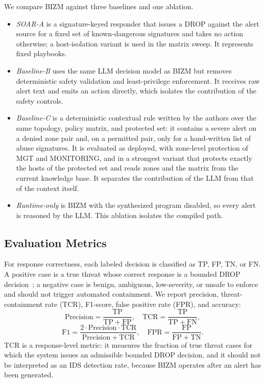 \documentclass[final,5p]{elsarticle}
\begin{document}
We compare BIZM against three baselines and one ablation.
\begin{itemize}[leftmargin=*]
    \item \emph{SOAR-A} is a signature-keyed responder that issues a DROP against the alert source for a fixed set of known-dangerous signatures and takes no action otherwise; a host-isolation variant is used in the matrix sweep. It represents fixed playbooks.
    \item \emph{Baseline-B} uses the same LLM decision model as BIZM but removes deterministic safety validation and least-privilege enforcement. It receives raw alert text and emits an action directly, which isolates the contribution of the safety controls.
    \item \emph{Baseline-C} is a deterministic contextual rule written by the authors over the same topology, policy matrix, and protected set: it contains a severe alert on a denied zone pair and, on a permitted pair, only for a hand-written list of abuse signatures. It is evaluated as deployed, with zone-level protection of MGT and MONITORING, and in a strongest variant that protects exactly the hosts of the protected set and reads zones and the matrix from the current knowledge base. It separates the contribution of the LLM from that of the context itself.
    \item \emph{Runtime-only} is BIZM with the synthesized program disabled, so every alert is reasoned by the LLM. This ablation isolates the compiled path.
\end{itemize}

\subsection{Evaluation Metrics}
\label{sec:evaluation_metrics}

For response correctness, each labeled decision is classified as TP, FP, TN, or FN. A positive case is a true threat whose correct response is a bounded DROP decision~\cite{jSAID23}; a negative case is benign, ambiguous, low-severity, or unsafe to enforce and should not trigger automated containment. We report precision, threat-containment rate (TCR), F1-score, false positive rate (FPR), and accuracy:
\[
\mathrm{Precision}=\frac{\mathrm{TP}}{\mathrm{TP}+\mathrm{FP}},
\quad
\mathrm{TCR}=\frac{\mathrm{TP}}{\mathrm{TP}+\mathrm{FN}},
\]
\[
\mathrm{F1}=\frac{2\cdot \mathrm{Precision}\cdot \mathrm{TCR}}
{\mathrm{Precision}+\mathrm{TCR}},
\quad
\mathrm{FPR}=\frac{\mathrm{FP}}{\mathrm{FP}+\mathrm{TN}}.
\]
TCR is a response-level metric: it measures the fraction of true threat cases for which the system issues an admissible bounded DROP decision, and it should not be interpreted as an IDS detection rate, because BIZM operates after an alert has been generated.
\end{document}
